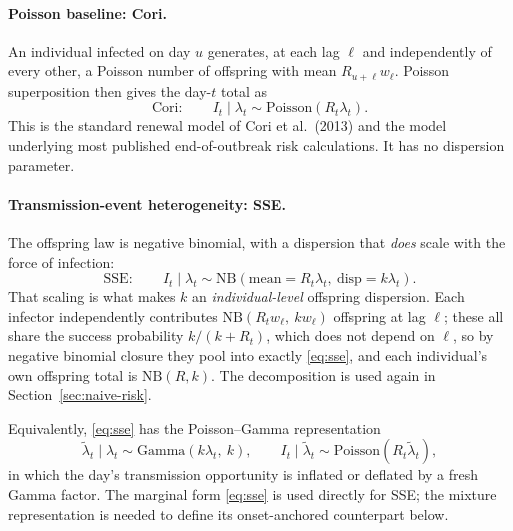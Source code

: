 \documentclass[11pt,a4paper]{article}
\theoremstyle{plain}
\theoremstyle{definition}
\newcommand{\NB}{\mathrm{NB}}
\newcommand{\Pois}{\mathrm{Poisson}}
\newcommand{\Gam}{\mathrm{Gamma}}
\newcommand{\sse}{SSE}
\newcommand{\cori}{Cori}
\begin{document}
\paragraph{Poisson baseline: \cori{}.} An individual infected on day $u$ generates, at
each lag $\ell$ and independently of every other, a Poisson number of offspring with mean
$R_{u+\ell}w_\ell$. Poisson superposition then gives the day-$t$ total as
\begin{equation}
  \text{\cori{}}: \qquad I_t \mid \lambda_t \sim \Pois\!\left(R_t\lambda_t\right).
  \label{eq:cori}
\end{equation}
This is the standard renewal model of Cori et al.\ (2013) and the model underlying most published
end-of-outbreak risk calculations. It has no dispersion parameter.

\paragraph{Transmission-event heterogeneity: \sse{}.} The offspring law is negative binomial,
with a dispersion that \emph{does} scale with the force of infection:
\begin{equation}
  \text{\sse{}}: \qquad
  I_t \mid \lambda_t \sim \NB\!\left(\text{mean}=R_t\lambda_t,\ \text{disp}=k\lambda_t\right).
  \label{eq:sse}
\end{equation}
That scaling is what makes $k$ an \emph{individual-level} offspring dispersion. Each infector
independently contributes $\NB(R_t w_\ell,\ k w_\ell)$ offspring at lag $\ell$; these all share
the success probability $k/(k+R_t)$, which does not depend on $\ell$, so by negative binomial
closure they pool into exactly \eqref{eq:sse}, and each individual's own offspring total is
$\NB(R,k)$. The decomposition is used again in Section~\ref{sec:naive-risk}.

Equivalently, \eqref{eq:sse} has the Poisson--Gamma representation
\begin{equation}
  \tilde\lambda_t \mid \lambda_t \sim \Gam\!\left(k\lambda_t,\ k\right),
  \qquad
  I_t \mid \tilde\lambda_t \sim \Pois\!\left(R_t\tilde\lambda_t\right),
  \label{eq:sse-convenient}
\end{equation}
in which the day's transmission opportunity is inflated or deflated by a fresh Gamma factor.
The marginal form \eqref{eq:sse} is used directly for \sse{}; the mixture representation is
needed to define its onset-anchored counterpart below.
\end{document}
